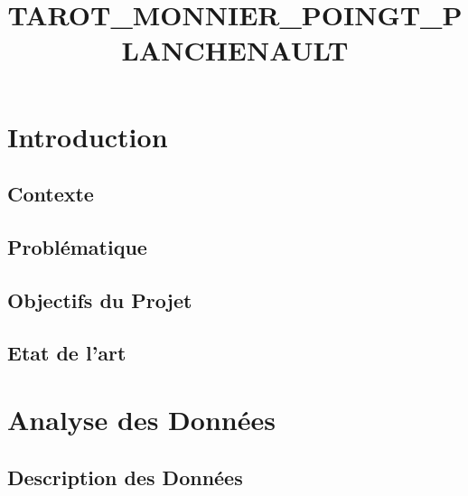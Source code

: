 \documentclass{rapport}
\title{TAROT_MONNIER_POINGT_PLANCHENAULT} %
\begin{document}





\fairemarges %
\fairepagedegarde %
\tabledematieres %



\section{Introduction}
\subsection{Contexte}

\cite{koBriefReviewFacial2018}
\cite{sariyanidiAutomaticAnalysisFacial2015}

\subsection{Problématique}

\subsection{Objectifs du Projet}

\subsection{Etat de l'art}

\section{Analyse des Données}
\subsection{Description des Données}
\end{document}
